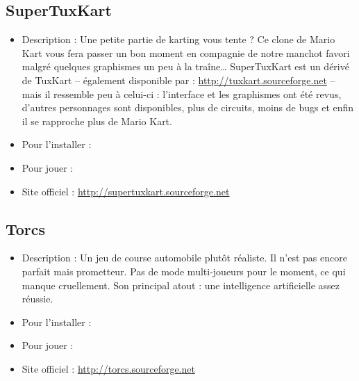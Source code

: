 \subsection{SuperTuxKart}
\begin{itemize}
\begingroup
{}
\item Description : Une petite partie de karting vous tente ? Ce clone de Mario Kart vous fera passer un bon moment en compagnie de notre manchot favori malgré quelques graphismes un peu à la traîne\ldots{} SuperTuxKart est un dérivé de TuxKart -- également disponible par  :  \url{http://tuxkart.sourceforge.net} -- mais il ressemble peu à celui-ci : l'interface et les graphismes ont été revus, d'autres personnages sont disponibles, plus de circuits, moins de bugs et enfin il se rapproche plus de Mario Kart.{\par}
\endgroup
\item Pour l'installer : 
\item Pour jouer : 
\item Site officiel : \url{http://supertuxkart.sourceforge.net}{\par}
\end{itemize}
\newpage
\subsection{Torcs}
\begin{itemize}
\begingroup
{}
\item Description : Un jeu de course automobile plutôt réaliste. Il n'est pas encore parfait mais prometteur. Pas de mode multi-joueurs pour le moment, ce qui manque cruellement. Son principal atout : une intelligence artificielle assez réussie.{\par}
\item Pour l'installer : 
\item Pour jouer : 
\item Site officiel : \url{http://torcs.sourceforge.net}{\par}
\endgroup
\end{itemize}
